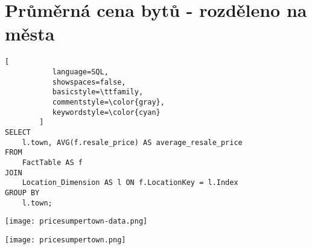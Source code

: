 \section{Průměrná cena bytů - rozděleno na města}

\begin{lstlisting}[
           language=SQL,
           showspaces=false,
           basicstyle=\ttfamily,
           commentstyle=\color{gray},
           keywordstyle=\color{cyan}
        ]
SELECT 
    l.town, AVG(f.resale_price) AS average_resale_price 
FROM 
    FactTable AS f 
JOIN 
    Location_Dimension AS l ON f.LocationKey = l.Index 
GROUP BY 
    l.town;
\end{lstlisting}

\texttt{[image: pricesumpertown-data.png]}

\texttt{[image: pricesumpertown.png]}
